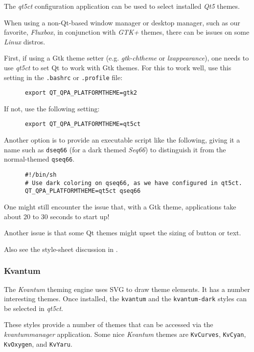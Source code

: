    The \textsl{qt5ct} configuration application can be used to select installed
   \textsl{Qt5} themes.

   When using a non-Qt-based window manager or desktop manager, such as our
   favorite, \textsl{Fluxbox}, in conjunction with \textsl{GTK+} themes,
   there can be issues on some \textsl{Linux} distros.

   First, if using a Gtk theme setter (e.g. \textsl{gtk-chtheme}
   or \textsl{lxappearance}),
   one needs to
   use \textsl{qt5ct} to set Qt to work with Gtk themes.
   For this to work well, use this setting in the \texttt{.bashrc} or
   \texttt{.profile} file:

   \begin{verbatim}
      export QT_QPA_PLATFORMTHEME=gtk2
   \end{verbatim}

   If not, use the following setting:

   \begin{verbatim}
      export QT_QPA_PLATFORMTHEME=qt5ct
   \end{verbatim}

   Another option is to provide an executable script like the following,
   giving it a name such as \texttt{dseq66}
   (for a dark themed \textsl{Seq66}) to
   distinguish it from the normal-themed \texttt{qseq66}.

   \begin{verbatim}
      #!/bin/sh
      # Use dark coloring on qseq66, as we have configured in qt5ct.
      QT_QPA_PLATFORMTHEME=qt5ct qseq66
   \end{verbatim}

   One might still encounter the issue that, with a Gtk theme, applications
   take about 20 to 30 seconds to start up!

   Another issue is that some Qt themes might upset the sizing of button or
   text.

   Also see the style-sheet discussion in
   .

\subsubsection{Kvantum}
\label{subsubsec:palettes_theming_kvantum}

   The \textsl{Kvantum} theming engine uses SVG to draw theme elements.
   It has a number interesting themes. Once installed,
   the \texttt{kvantum} and
   the \texttt{kvantum-dark}
   styles can be selected in \textsl{qt5ct}.

   These styles provide a number of themes that can be
   accessed via the \textsl{kvantummanager} application.
   Some nice \textsl{Kvantum} themes are \texttt{KvCurves},
   \texttt{KvCyan},
   \texttt{KvOxygen}, and
   \texttt{KvYaru}.

